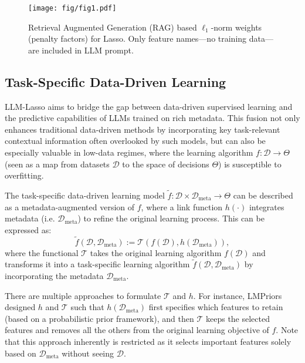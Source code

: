 \begin{figure}
    \centering
\texttt{[image: fig/fig1.pdf]}
\vspace{-0.6cm}
\scriptsize 
    \caption{Retrieval Augmented Generation (RAG) based $\ell_1$-norm weights (penalty factors) for Lasso. Only feature names---no training data--- are included in LLM prompt.} 
    \label{fig:rag}
\end{figure}

\subsection{Task-Specific Data-Driven Learning}
LLM-Lasso aims to bridge the gap between data-driven supervised learning and the predictive capabilities of LLMs trained on rich metadata. This fusion not only enhances traditional data-driven methods by incorporating key task-relevant contextual information often overlooked by such models, but can also be especially valuable in low-data regimes, where the learning algorithm $f:\mathcal{D}\rightarrow\Theta$ (seen as a map from datasets $\mathcal{D}$ to the space of decisions $\Theta$) is susceptible to overfitting.

The task-specific data-driven learning model $\tilde{f}:\mathcal{D}\times\mathcal{D}_\text{meta}\rightarrow\Theta$ can be described as a metadata-augmented version of $f$, where a link function $h(\cdot)$ integrates metadata (i.e. $\mathcal{D}_\text{meta}$) to refine the original learning process. This can be expressed as:
\[
\tilde{f}(\mathcal{D}, \mathcal{D}_\text{meta}) := \mathcal{T}(f(\mathcal{D}),  h(\mathcal{D}_{\text{meta}})),
\]
where the functional $\mathcal{T}$ takes the original learning algorithm $f(\mathcal{D})$ and transforms it into a task-specific learning algorithm $\tilde{f}(\mathcal{D}, \mathcal{D}_\text{meta})$ by incorporating the metadata $\mathcal{D}_\text{meta}$. 

There are multiple approaches to formulate $\mathcal{T}$ and $h$.
For instance, LMPriors \citep{choi2022lmpriorspretrainedlanguagemodels} designed $h$ and $\mathcal{T}$ such that $h(\mathcal{D}_{\text{meta}})$ first specifies which features to retain (based on a probabilistic prior framework), and then $\mathcal{T}$ keeps the selected features and removes all the others from the original learning objective of $f$. 
Note that this approach inherently is restricted as it selects important features solely based on $\mathcal{D}_\text{meta}$ without seeing $\mathcal{D}$.

